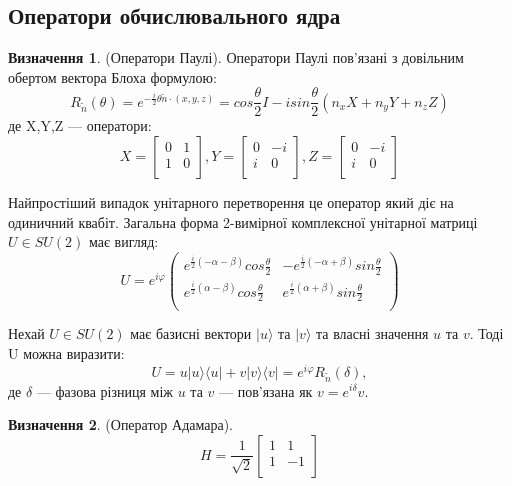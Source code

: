 \documentclass{article}
\theoremstyle{definition}
\newtheorem{definition}{Визначення}
\begin{document}
\subsection{Оператори обчислювального ядра}

\begin{definition} (Оператори Паулі).
Оператори Паулі пов'язані з довільним обертом вектора Блоха формулою:
$$
R_{\tilde{n}}(\theta) = e^{-\frac{i}{2}\theta\tilde{n}\cdot(x,y,z)} = cos\frac{\theta}{2}I - i sin\frac{\theta}{2} (n_x X + n_y Y + n_z Z)
$$
де X,Y,Z --- оператори:
$$
X=
\begin{bmatrix}
0 & 1 \\
1 & 0 \\
\end{bmatrix},
Y=
\begin{bmatrix}
0 & -i \\
i & 0 \\
\end{bmatrix},
Z=
\begin{bmatrix}
0 & -i \\
i & 0 \\
\end{bmatrix}
$$
\end{definition}

Найпростіший випадок унітарного перетворення це оператор який діє на одиничний квабіт.
Загальна форма 2-вимірної комплексної унітарної матриці $U \in SU(2)$ має вигляд:
$$
U = e^{i\varphi}\begin{pmatrix}
e^{\frac{i}{2}(-\alpha-\beta)}cos\frac{\theta}{2} & -e^{\frac{i}{2}(-\alpha+\beta)}sin\frac{\theta}{2} \\
e^{\frac{i}{2}(\alpha-\beta)}cos\frac{\theta}{2} & e^{\frac{i}{2}(\alpha+\beta)}sin\frac{\theta}{2} \\
\end{pmatrix}
$$

Нехай $U \in SU(2)$ має базисні вектори $|u\rangle$ та $|v\rangle$ та
власні значення $u$ та $v$. Тоді U можна виразити:
$$
U = u|u\rangle\langle u|+v|v\rangle\langle v| = e^{i\varphi}R_{\tilde{n}}(\delta),
$$
де $\delta$ --- фазова різниця між $u$ та $v$ --- пов'язана як $v = e^{i\delta}v$.

\begin{definition} (Оператор Адамара).
$$
H=\frac{1}{\sqrt{2}}
\begin{bmatrix}
1 & 1 \\
1 & -1 \\
\end{bmatrix}
$$
\end{definition}
\end{document}

